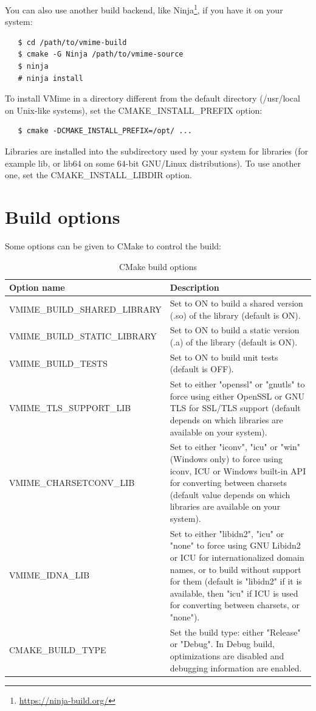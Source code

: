 You can also use another build backend, like
Ninja\footnote{\url{https://ninja-build.org/}}, if you have it on your system:

\begin{verbatim}
   $ cd /path/to/vmime-build
   $ cmake -G Ninja /path/to/vmime-source
   $ ninja
   # ninja install
\end{verbatim}

To install VMime in a directory different from the default directory
({\vcode /usr/local} on Unix-like systems), set the
{\vcode CMAKE\_INSTALL\_PREFIX} option:

\begin{verbatim}
   $ cmake -DCMAKE_INSTALL_PREFIX=/opt/ ...
\end{verbatim}

Libraries are installed into the subdirectory used by your system for
libraries (for example {\vcode lib}, or {\vcode lib64} on some 64-bit
GNU/Linux distributions). To use another one, set the
{\vcode CMAKE\_INSTALL\_LIBDIR} option.


\section{\label{build-options}Build options}

Some options can be given to CMake to control the build:

\begin{table}[!ht]
\noindent\begin{tabularx}{1.0\textwidth}{|l|X|}
\hline
	{\bf Option name} &
	{\bf Description} \\
\hline
\hline
VMIME\_BUILD\_SHARED\_LIBRARY &
Set to ON to build a shared version (.so) of the library (default is ON). \\
\hline
VMIME\_BUILD\_STATIC\_LIBRARY &
Set to ON to build a static version (.a) of the library (default is ON). \\
\hline
VMIME\_BUILD\_TESTS &
Set to ON to build unit tests (default is OFF). \\
\hline
VMIME\_TLS\_SUPPORT\_LIB &
Set to either "openssl" or "gnutls" to force using either OpenSSL or GNU TLS
for SSL/TLS support (default depends on which libraries are available on
your system). \\
\hline
VMIME\_CHARSETCONV\_LIB &
Set to either "iconv", "icu" or "win" (Windows only) to force using iconv, ICU
or Windows built-in API for converting between charsets (default value depends
on which libraries are available on your system). \\
\hline
VMIME\_IDNA\_LIB &
Set to either "libidn2", "icu" or "none" to force using GNU Libidn2 or ICU
for internationalized domain names, or to build without support for them
(default is "libidn2" if it is available, then "icu" if ICU is used for
converting between charsets, or "none"). \\
\hline
CMAKE\_BUILD\_TYPE &
Set the build type: either "Release" or "Debug". In Debug build, optimizations
are disabled and debugging information are enabled. \\
\hline
\end{tabularx}
\caption{CMake build options}
\end{table}
